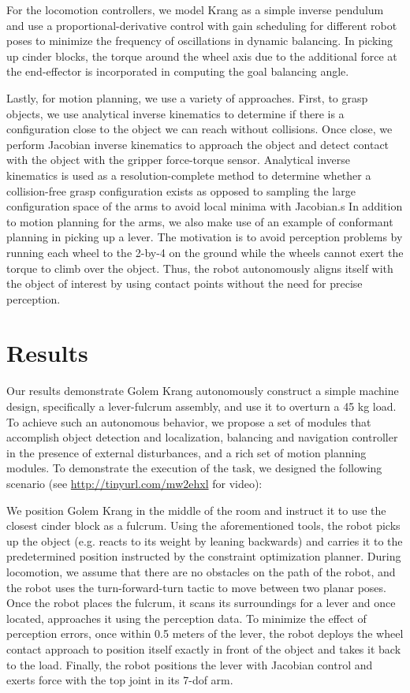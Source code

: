\documentclass{article}
\begin{document}
For the locomotion controllers, we model Krang as a simple inverse pendulum and use a
proportional-derivative control with gain scheduling for different robot poses to minimize the
frequency of oscillations in dynamic balancing. In picking up cinder blocks, the torque around the
wheel axis due to the additional force at the end-effector is incorporated in computing the goal
balancing angle.

Lastly, for motion planning, we use a variety of approaches. First, to grasp objects, we use
analytical inverse kinematics to determine if there is a configuration close to the object we can
reach without collisions. Once close, we perform Jacobian inverse kinematics to approach the object
and detect contact with the object with the gripper force-torque sensor. Analytical inverse
kinematics is used as a resolution-complete method to determine whether a collision-free grasp
configuration exists as opposed to sampling the large configuration space of the arms to avoid local
minima with Jacobian.s In addition to motion planning for the arms, we also make use of an example
of conformant planning in picking up a lever. The motivation is to avoid perception problems by
running each wheel to the 2-by-4 on the ground while the wheels cannot exert the torque to climb
over the object. Thus, the robot autonomously aligns itself with the object of interest by using
contact points without the need for precise perception.

\section{Results}

Our results demonstrate Golem Krang autonomously construct a simple machine design, specifically a
lever-fulcrum assembly, and use it to overturn a 45 kg load. To achieve such an autonomous behavior,
we propose a set of modules that accomplish object detection and localization, balancing and
navigation controller in the presence of external disturbances, and a rich set of motion planning
modules. To demonstrate the execution of the task, we designed the following scenario (see
\url{http://tinyurl.com/mw2ehxl} for video):

We position Golem Krang in the middle of the room and instruct it to use the closest cinder block as
a fulcrum. Using the aforementioned tools, the robot picks up the object (e.g. reacts to its weight
by leaning backwards) and carries it to the predetermined position instructed by the constraint
optimization planner. During locomotion, we assume that there are no obstacles on the path of the
robot, and the robot uses the turn-forward-turn tactic to move between two planar poses. Once the
robot places the fulcrum, it scans its surroundings for a lever and once located, approaches it
using the perception data. To minimize the effect of perception errors, once within 0.5 meters of
the lever, the robot deploys the wheel contact approach to position itself exactly in front of the
object and takes it back to the load. Finally, the robot positions the lever with Jacobian control
and exerts force with the top joint in its 7-dof arm.
\end{document}
